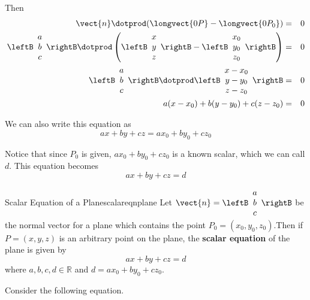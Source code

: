 Then 
\begin{eqnarray*}
\vect{n} \dotprod (\longvect{0P} - \longvect{0P_0}) &=& 0 \\
\leftB
\begin{array}{c}
a \\
b \\
c
\end{array}
\rightB
\dotprod
\left(
\leftB
\begin{array}{c}
x \\
y \\
z
\end{array}
\rightB
-
\leftB
\begin{array}{c}
x_0 \\
y_0 \\
z_0
\end{array}
\rightB
\right) 
&=& 0 \\
\leftB
\begin{array}{c}
a \\
b \\
c
\end{array}
\rightB
\dotprod
\leftB
\begin{array}{c}
x - x_0 \\
y - y_0 \\
z - z_0
\end{array}
\rightB
&=& 0 
\\
a(x - x_0) + b (y - y_0) + c (z-z_0) &=& 0 
\end{eqnarray*}

We can also write this equation as 
\[
ax + by + cz = ax_0 + by_0 + cz_0
\]

Notice that since $P_0$ is given, $ax_0+by_0+cz_0$ is a known scalar, which we can call $d$. This equation becomes
\[
ax + by + cz = d
\]

\begin{definition}{Scalar Equation of a Plane}{scalareqnplane}
Let $\vect{n} = \leftB 
\begin{array}{c}
a \\
b \\
c
\end{array}
\rightB $
be the normal vector for a plane which contains the point $P_0 = (x_0, y_0, z_0)$.Then if $P=(x,y,z)$ is an arbitrary point on the plane, the  \textbf{scalar equation} of the plane is given by
\[
ax + by + cz = d 
\]
where $ a,b,c,d \in \mathbb{R}$ and $d = ax_0 + by_0 + cz_0$.
\end{definition}

Consider the following equation.

